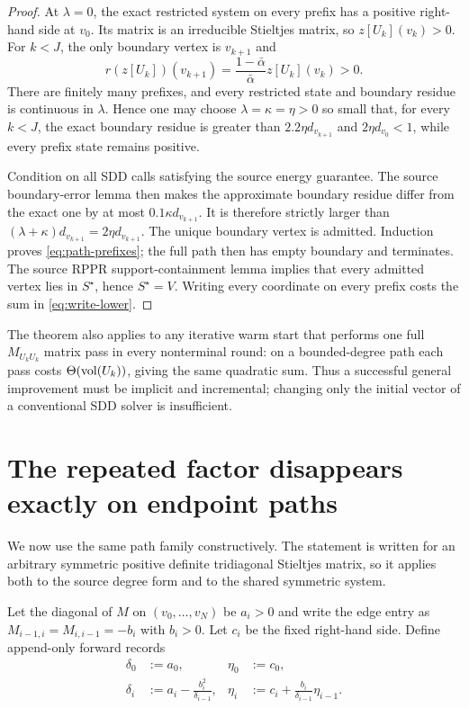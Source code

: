 \documentclass[11pt]{article}
\begin{document}
\begin{proof}
At $\lambda=0$, the exact restricted system on every prefix has a positive
right-hand side at $v_0$.  Its matrix is an irreducible Stieltjes matrix, so
$z[U_k](v_k)>0$.  For $k<J$, the only boundary vertex is $v_{k+1}$ and
\begin{equation}
 r(z[U_k])(v_{k+1})
 =\frac{1-\bar\alpha}{\bar\alpha}z[U_k](v_k)>0.
 \label{eq:positive-path-gate}
\end{equation}
There are finitely many prefixes, and every restricted state and boundary
residue is continuous in $\lambda$.  Hence one may choose
$\lambda=\kappa=\eta>0$ so small that, for every $k<J$, the exact boundary
residue is greater than $2.2\eta d_{v_{k+1}}$ and
$2\eta d_{v_0}<1$, while every prefix state remains positive.

Condition on all SDD calls satisfying the source energy guarantee.  The
source boundary-error lemma then makes the approximate boundary residue
differ from the exact one by at most $0.1\kappa d_{v_{k+1}}$.  It is therefore
strictly larger than
$(\lambda+\kappa)d_{v_{k+1}}=2\eta d_{v_{k+1}}$.  The unique boundary vertex
is admitted.  Induction proves \cref{eq:path-prefixes}; the full path then has
empty boundary and terminates.  The source RPPR support-containment lemma
implies that every admitted vertex lies in $S^\star$, hence $S^\star=V$.
Writing every coordinate on every prefix costs the sum in
\cref{eq:write-lower}.
\end{proof}

The theorem also applies to any iterative warm start that performs one full
$M_{U_kU_k}$ matrix pass in every nonterminal round: on a bounded-degree path
each pass costs $\Theta(\operatorname{vol}(U_k))$, giving the same quadratic sum.  Thus a
successful general improvement must be implicit and incremental; changing
only the initial vector of a conventional SDD solver is insufficient.

\section{The repeated factor disappears exactly on endpoint paths}
\label{sec:path-solver}

We now use the same path family constructively.  The statement is written for
an arbitrary symmetric positive definite tridiagonal Stieltjes matrix, so it
applies both to the source degree form and to the shared symmetric system.

Let the diagonal of $M$ on $(v_0,\ldots,v_N)$ be $a_i>0$ and write the edge
entry as $M_{i-1,i}=M_{i,i-1}=-b_i$ with $b_i>0$.  Let $c_i$ be the fixed
right-hand side.  Define append-only forward records
\begin{align}
 \delta_0&:=a_0,
 &\eta_0&:=c_0,
 \label{eq:path-forward-base}\\
 \delta_i&:=a_i-\frac{b_i^2}{\delta_{i-1}},
 &\eta_i&:=c_i+\frac{b_i}{\delta_{i-1}}\eta_{i-1}.
 \label{eq:path-forward}
\end{align}
\end{document}
